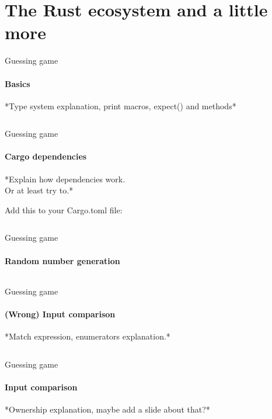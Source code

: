\documentclass[usenames,dvipsnames,10pt,aspectratio=169]{beamer}
\begin{document}
\section{The Rust ecosystem and a little more}

\begin{frame}{Guessing game}
	\framesubtitle{Basics}
	*Type system explanation, print macros, expect() and methods*
	\inputminted[fontsize=\normalsize]{c}{code/guess1.rs}
\end{frame}

\begin{frame}{Guessing game}
	\framesubtitle{Cargo dependencies}
	\Large
	*Explain how dependencies work.\\
	Or at least try to.*
	\vspace{0.5cm}

	Add this to your Cargo.toml file:
	\inputminted[fontsize=\Large]{c}{code/toml1.toml}
\end{frame}

\begin{frame}{Guessing game}
	\framesubtitle{Random number generation}
	\inputminted[fontsize=\footnotesize]{c}{code/guess2.rs}
\end{frame}

\begin{frame}{Guessing game}
	\framesubtitle{(Wrong) Input comparison}
	*Match expression, enumerators explanation.*
	\inputminted[fontsize=\normalsize]{c}{code/guess3.rs}
\end{frame}

\begin{frame}{Guessing game}
	\framesubtitle{Input comparison}
	*Ownership explanation, maybe add a slide about that?*
	\inputminted[fontsize=\normalsize]{c}{code/guess4.rs}
\end{frame}
\end{document}
